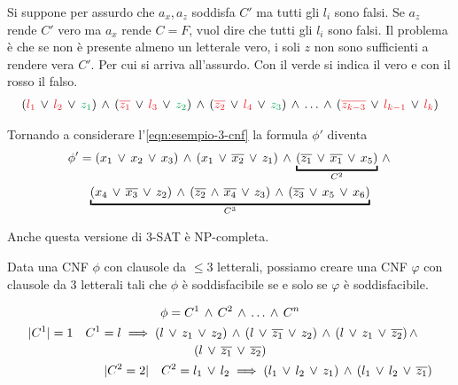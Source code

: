 Si suppone per assurdo che $a_x, a_z$ soddisfa $C'$ ma tutti gli $l_i$ sono falsi. Se $a_z$ rende $C'$ vero ma $a_x$ rende $C = F$, vuol dire che tutti gli $l_i$ sono falsi. Il problema è che se non è presente almeno un letterale vero, i soli $z$ non sono sufficienti a rendere vera $C'$. Per cui si arriva all'assurdo. Con il verde si indica il vero e con il rosso il falso.
\begin{gather*}
	(\red{l_1}\ve \red{l_2}\ve \green{z_1})\ive(\red{\overline{z_1}}\ve \red{l_3}\ve \green{z_2})\ive (\red{\overline{z_2}}\ve \red{l_4}\ve \green{z_3})\ive \dots\ive (\red{\overline{z_{k-3}}}\ve \red{l_{k-1}}\ve \red{l_k})
\end{gather*}

Tornando a considerare l'\cref{eqn:esempio-3-cnf} la formula $\phi'$ diventa
\begin{gather*}
	\phi'=(x_1\ve x_2\ve x_3)\ive(x_1\ve\overline{x_2}\ve z_1)\ive \underbracket{(\overline{z_1}\ve \overline{x_1}\ve x_5)}_{C^2}\ive\\
	\underbracket{(x_4\ve\overline{x_3}\ve z_2)\ive(\overline{z_2}\ive \overline{x_4}\ve z_3)\ive (\overline{z_3}\ve x_5\ve x_6)}_{C^3}
\end{gather*}


Anche questa versione di 3-SAT è NP-completa.
\begin{demonstration}
	Data una CNF $\phi$ con clausole da $\le 3$ letterali, possiamo creare una CNF $\varphi$ con clausole da 3 letterali tali che $\phi$ è soddisfacibile se e solo se $\varphi$ è soddisfacibile.
	
	\begin{gather*}
		\phi=C^1\ive C^2\ive\dots\ive C^n\\
		\begin{multlined}
			|C^1|=1\quad C^1=l\implies(l\ve z_1\ve z_2)\ive(l\ve\overline{z_1}\ve z_2)\ive(l\ve z_1\ve \overline{z_2})\ive\\(l\ve \overline{z_1}\ve\overline{z_2})\\
			|C^2=2|\quad C^2=l_1\ve l_2\implies (l_1\ve l_2\ve z_1)\ive (l_1\ve l_2\ve \overline{z_1})
		\end{multlined}
	\end{gather*}
\end{demonstration}


